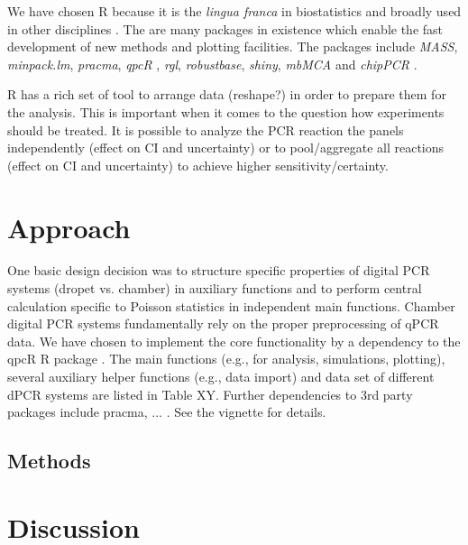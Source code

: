 \documentclass{bioinfo}
\begin{document}
We have chosen R because it is the \textit{lingua franca} in biostatistics and broadly 
used in other disciplines \cite{rodiger_r_2015}. The are many packages in existence which enable the 
fast development of new methods and plotting facilities. The packages include 
\textit{MASS}, \textit{minpack.lm}, \textit{pracma}, \textit{qpcR} \cite{ritz_qpcr_2008}, \textit{rgl}, \textit{robustbase}, \textit{shiny}, \textit{mbMCA} \cite{rodiger_surface_2013} and \textit{chipPCR} \cite{rodiger_chippcr_2015}.

R has a rich set of tool to arrange data (reshape?) in order to prepare them for 
the analysis. This is important when it comes to the question how experiments 
should be treated. It is possible to analyze the PCR reaction the panels 
independently (effect on CI and uncertainty) or to pool/aggregate all reactions 
(effect on CI and uncertainty) to achieve higher sensitivity/certainty.

\section{Approach}
One basic design decision was to structure specific properties of digital PCR 
systems (dropet vs. chamber) in auxiliary functions and to perform central 
calculation specific to Poisson statistics in independent main functions. 
Chamber digital PCR systems fundamentally rely on the proper preprocessing of 
qPCR data. We have chosen to implement the core functionality by a dependency to 
the qpcR R package \cite{ritz_qpcr_2008}. The main functions (e.g., for analysis, 
simulations, plotting), several auxiliary helper functions (e.g., data import) 
and data set of different dPCR systems are listed in Table XY. Further 
dependencies to 3rd party packages include pracma, ... . See the vignette for 
details.
\begin{methods}
\section{Methods}



\end{methods}


\section{Discussion}





%
%
\end{document}
